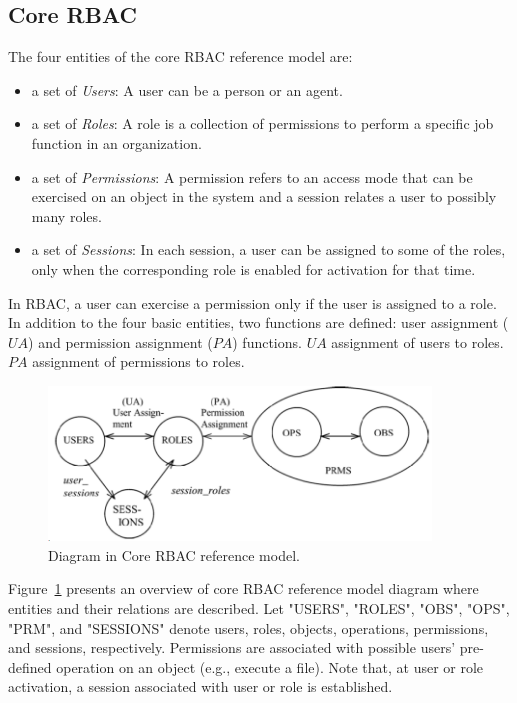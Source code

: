 \subsection{Core RBAC} 

The four entities of the core RBAC reference model are:

\begin{itemize}
\setlength{\itemsep}{0.25pt}
\item a set of \emph{Users}: A user can be a person or an agent.
\item a set of \emph{Roles}: A role is a collection of permissions to perform a specific job function in an organization.
\item a set of \emph{Permissions}: A permission refers to an access mode that can be exercised on an object in the system and a session relates a user to possibly many roles.
\item a set of \emph{Sessions}: In each session, a user can be assigned to some of the roles, only when the corresponding role is enabled for activation for that time.		
\end{itemize}

In RBAC, a user can exercise a permission only if the user is assigned to a role.
In addition to the four basic entities, two functions are defined:
user assignment ($UA$) and permission assignment ($PA$) functions.
$UA$ assignment of users to roles.
$PA$ assignment of permissions to roles.

\begin{figure}[ht]
    \centering
        \includegraphics[width=4.0in]{sections/core-model.png}
    \caption{\label{fig:overview}Diagram in Core RBAC reference model\cite{ferraiolokuhn}.}
\end{figure}

Figure~\ref{fig:overview} presents an overview of core RBAC reference model diagram where entities and their relations are described.
Let "USERS", "ROLES", "OBS", "OPS", "PRM", and "SESSIONS" denote users, roles, objects, operations, permissions, and sessions, respectively.
Permissions are associated with possible users' pre-defined operation on an object (e.g., execute a file).
Note that, at user or role activation, a session associated with user or role is established.


